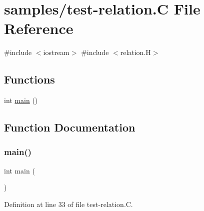 \hypertarget{test-relation_8_c}{}\section{samples/test-\/relation.C File Reference}
\label{test-relation_8_c}
{\ttfamily \#include $<$iostream$>$}\newline
{\ttfamily \#include $<$relation.\+H$>$}\newline
\subsection*{Functions}
\begin{DoxyCompactItemize}
\item 
int \hyperlink{test-relation_8_c_ae66f6b31b5ad750f1fe042a706a4e3d4}{main} ()
\end{DoxyCompactItemize}


\subsection{Function Documentation}
\mbox{\label{test-relation_8_c_ae66f6b31b5ad750f1fe042a706a4e3d4}} 
\subsubsection{\texorpdfstring{main()}{main()}}
{\footnotesize\ttfamily int main (\begin{DoxyParamCaption}{ }\end{DoxyParamCaption})}



Definition at line 33 of file test-\/relation.\+C.

